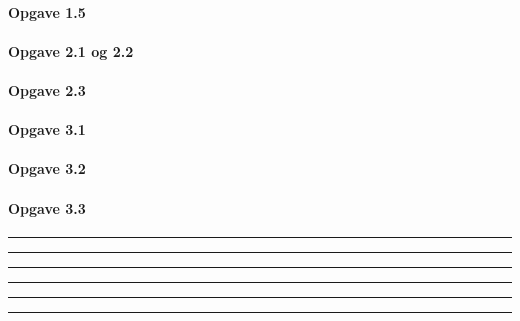\documentclass[]{book}
\let\oldparagraph\paragraph
\renewcommand{\paragraph}[1]{\oldparagraph{#1}\mbox{}}
\begin{document}
\hypertarget{opgave-1.5}{%
\paragraph{Opgave 1.5}\label{opgave-1.5}}

\hypertarget{opgave-2.1-og-2.2}{%
\paragraph{Opgave 2.1 og 2.2}\label{opgave-2.1-og-2.2}}

\hypertarget{opgave-2.3}{%
\paragraph{Opgave 2.3}\label{opgave-2.3}}

\hypertarget{opgave-3.1}{%
\paragraph{Opgave 3.1}\label{opgave-3.1}}

\hypertarget{opgave-3.2}{%
\paragraph{Opgave 3.2}\label{opgave-3.2}}

\hypertarget{opgave-3.3}{%
\paragraph{Opgave 3.3}\label{opgave-3.3}}

\begin{center}\rule{0.5\linewidth}{\linethickness}\end{center}

\begin{center}\rule{0.5\linewidth}{\linethickness}\end{center}

\begin{center}\rule{0.5\linewidth}{\linethickness}\end{center}

\begin{center}\rule{0.5\linewidth}{\linethickness}\end{center}

\begin{center}\rule{0.5\linewidth}{\linethickness}\end{center}

\begin{center}\rule{0.5\linewidth}{\linethickness}\end{center}
\end{document}
